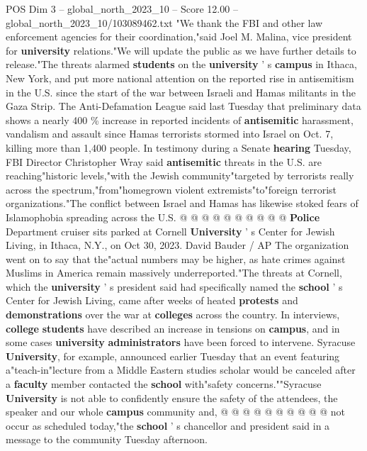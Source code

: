 \begin{textsample}{POS Dim 3 – global\_north\_2023\_10 – Score 12.00 – global\_north\_2023\_10/103089462.txt}  \label{ex:f3_pos_278}
"We thank the FBI and other law enforcement agencies for their coordination,"said Joel M.
Malina, vice president for \textbf{university} relations."We will update the public as we have further details to release."The threats alarmed \textbf{students} on the \textbf{university} ' s \textbf{campus} in Ithaca, New York, and put more national attention on the reported rise in antisemitism in the U.S. since the start of the war between Israeli and Hamas militants in the Gaza Strip.
The Anti-Defamation League said last Tuesday that preliminary data shows a nearly 400 \% increase in reported incidents of \textbf{antisemitic} harassment, vandalism and assault since Hamas terrorists stormed into Israel on Oct. 7, killing more than 1,400 people.
In testimony during a Senate \textbf{hearing} Tuesday, FBI Director Christopher Wray said \textbf{antisemitic} threats in the U.S. are reaching"historic levels,"with the Jewish community"targeted by terrorists really across the spectrum,"from"homegrown violent extremists"to"foreign terrorist organizations."The conflict between Israel and Hamas has likewise stoked fears of Islamophobia spreading across the U.S. @ @ @ @ @ @ @ @ @ @ \textbf{Police} Department cruiser sits parked at Cornell \textbf{University} ' s Center for Jewish Living, in Ithaca, N.Y., on Oct 30, 2023.
David Bauder / AP The organization went on to say that the"actual numbers may be higher, as hate crimes against Muslims in America remain massively underreported."The threats at Cornell, which the \textbf{university} ' s president said had specifically named the \textbf{school} ' s Center for Jewish Living, came after weeks of heated \textbf{protests} and \textbf{demonstrations} over the war at \textbf{colleges} across the country.
In interviews, \textbf{college} \textbf{students} have described an increase in tensions on \textbf{campus}, and in some cases \textbf{university} \textbf{administrators} have been forced to intervene.
Syracuse \textbf{University}, for example, announced earlier Tuesday that an event featuring a"teach-in"lecture from a Middle Eastern studies scholar would be canceled after a \textbf{faculty} member contacted the \textbf{school} with"safety concerns.""Syracuse \textbf{University} is not able to confidently ensure the safety of the attendees, the speaker and our whole \textbf{campus} community and, @ @ @ @ @ @ @ @ @ @ not occur as scheduled today,"the \textbf{school} ' s chancellor and president said in a message to the community Tuesday afternoon.

\end{textsample}
